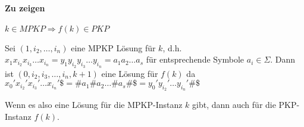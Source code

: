 \paragraph*{Zu zeigen} $k \in MPKP \Rightarrow f(k) \in PKP$

Sei $(1,i_2,\dots,i_n)$ eine MPKP Lösung für $k$, d.h. $x_1 x_{i_2} x_{i_3} \dots x_{i_n} = y_1 y_{i_2} y_{i_3} \dots y_{i_n} = a_1 a_2 \dots a_s$ für entsprechende Symbole $a_i \in \Sigma$. Dann ist $(0,i_2,i_3,\dots,i_n,k+1)$ eine Lösung für $f(k)$ da $x_0' x_{i_2}' x_{i_3}' \dots x_{i_n}'\$ = \#a_1\#a_2 \dots \#a_s\#\$ = y_0' y_{i_2}' \dots y_{i_n}'\#\$$

\para{} Wenn es also eine Lösung für die MPKP-Instanz $k$ gibt, dann auch für die PKP-Instanz $f(k)$.